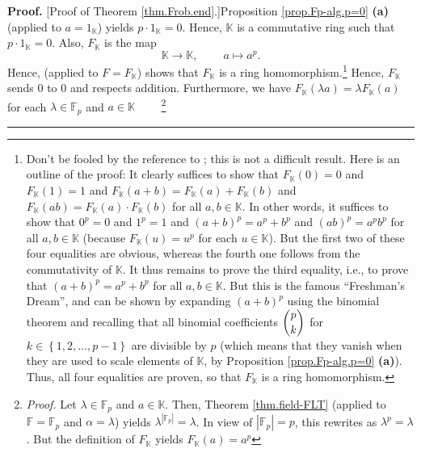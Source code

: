 \documentclass[numbers=enddot,12pt,final,onecolumn,notitlepage]{scrartcl}%
\theoremstyle{definition}
\newenvironment{proof}[1][Proof]{\noindent\textbf{#1.} }{\ \rule{0.5em}{0.5em}}
\begin{document}
\begin{proof}
[Proof of Theorem \ref{thm.Frob.end}.]Proposition \ref{prop.Fp-alg.p=0}
\textbf{(a)} (applied to $a=1_{\mathbb{K}}$) yields $p\cdot1_{\mathbb{K}}=0$.
Hence, $\mathbb{K}$ is a commutative ring such that $p\cdot1_{\mathbb{K}}=0$.
Also, $F_{\mathbb{K}}$ is the map
\[
\mathbb{K}\rightarrow\mathbb{K},\ \ \ \ \ \ \ \ \ \ a\mapsto a^{p}.
\]
Hence, \cite[Corollary 5.11.3]{19s} (applied to $F=F_{\mathbb{K}}$) shows that
$F_{\mathbb{K}}$ is a ring homomorphism.\footnote{Don't be fooled by the
reference to \cite{19s}; this is not a difficult result. Here is an outline of
the proof: It clearly suffices to show that $F_{\mathbb{K}}\left(  0\right)
=0$ and $F_{\mathbb{K}}\left(  1\right)  =1$ and $F_{\mathbb{K}}\left(
a+b\right)  =F_{\mathbb{K}}\left(  a\right)  +F_{\mathbb{K}}\left(  b\right)
$ and $F_{\mathbb{K}}\left(  ab\right)  =F_{\mathbb{K}}\left(  a\right)  \cdot
F_{\mathbb{K}}\left(  b\right)  $ for all $a,b\in\mathbb{K}$. In other words,
it suffices to show that $0^{p}=0$ and $1^{p}=1$ and $\left(  a+b\right)
^{p}=a^{p}+b^{p}$ and $\left(  ab\right)  ^{p}=a^{p}b^{p}$ for all
$a,b\in\mathbb{K}$ (because $F_{\mathbb{K}}\left(  u\right)  =u^{p}$ for each
$u\in\mathbb{K}$). But the first two of these four equalities are obvious,
whereas the fourth one follows from the commutativity of $\mathbb{K}$. It thus
remains to prove the third equality, i.e., to prove that $\left(  a+b\right)
^{p}=a^{p}+b^{p}$ for all $a,b\in\mathbb{K}$. But this is the famous
\textquotedblleft Freshman's Dream\textquotedblright, and can be shown by
expanding $\left(  a+b\right)  ^{p}$ using the binomial theorem and recalling
that all binomial coefficients $\dbinom{p}{k}$ for $k\in\left\{
1,2,\ldots,p-1\right\}  $ are divisible by $p$ (which means that they vanish
when they are used to scale elements of $\mathbb{K}$, by Proposition
\ref{prop.Fp-alg.p=0} \textbf{(a)}). Thus, all four equalities are proven, so
that $F_{\mathbb{K}}$ is a ring homomorphism.} Hence, $F_{\mathbb{K}}$ sends
$0$ to $0$ and respects addition. Furthermore, we have $F_{\mathbb{K}}\left(
\lambda a\right)  =\lambda F_{\mathbb{K}}\left(  a\right)  $ for each
$\lambda\in\mathbb{F}_{p}$ and $a\in\mathbb{K}$%
\ \ \ \ \footnote{\textit{Proof.} Let $\lambda\in\mathbb{F}_{p}$ and
$a\in\mathbb{K}$. Then, Theorem \ref{thm.field-FLT} (applied to $\mathbb{F}%
=\mathbb{F}_{p}$ and $\alpha=\lambda$) yields $\lambda^{\left\vert
\mathbb{F}_{p}\right\vert }=\lambda$. In view of $\left\vert \mathbb{F}%
_{p}\right\vert =p$, this rewrites as $\lambda^{p}=\lambda$. But the
definition of $F_{\mathbb{K}}$ yields $F_{\mathbb{K}}\left(  a\right)  =a^{p}$
}
\end{proof}
\end{document}
